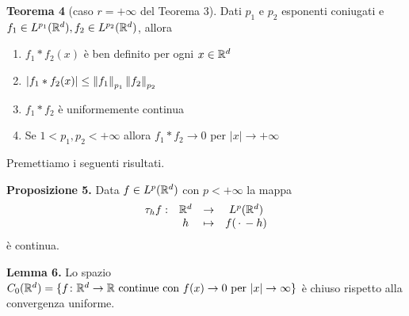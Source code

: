 \textbf{Teorema 4} (caso $r = +\infty$ del Teorema 3).
Dati $p_1$ e $p_2$ esponenti coniugati e $f_1 \in L^{p_1}(\mathbb R^d), f_2 \in L^{p_2}(\mathbb R^d)$, allora
\begin{enumerate}
	\item \label{item:20ott_th4_1} 
		$f_1 \ast f_2(x)$ è ben definito per ogni $x \in \mathbb R^d$

	\item \label{item:20ott_th4_2}
		$|f_1 \ast f_2(x)| \leq \left\lVert f_1 \right\rVert_{p_1} \left\lVert f_2 \right\rVert_{p_2}$

	\item \label{item:20ott_th4_3} 
		$f_1 \ast f_2$ è uniformemente continua

	\item \label{item:20ott_th4_4}
		Se $1 < p_1, p_2 < +\infty$ allora $f_1 \ast f_2 \to 0$ per $|x| \to +\infty$
\end{enumerate}

Premettiamo i seguenti risultati.

\textbf{Proposizione 5.}
Data $f \in L^p(\mathbb R^d)$ con $p < +\infty$ la mappa
$$
\begin{array}{cccc}
	\tau_h f : & \mathbb R^d & \to & L^p(\mathbb R^d) \\
	& h & \mapsto & f(\,\cdot\, - h)
\end{array}
$$
è continua.

\textbf{Lemma 6.}
Lo spazio $C_0(\mathbb R^d) = \{ f \colon \mathbb R^d \to \mathbb R \text{ continue con } f(x) \to 0 \text{ per } |x| \to \infty \}$ è chiuso rispetto alla convergenza uniforme.


